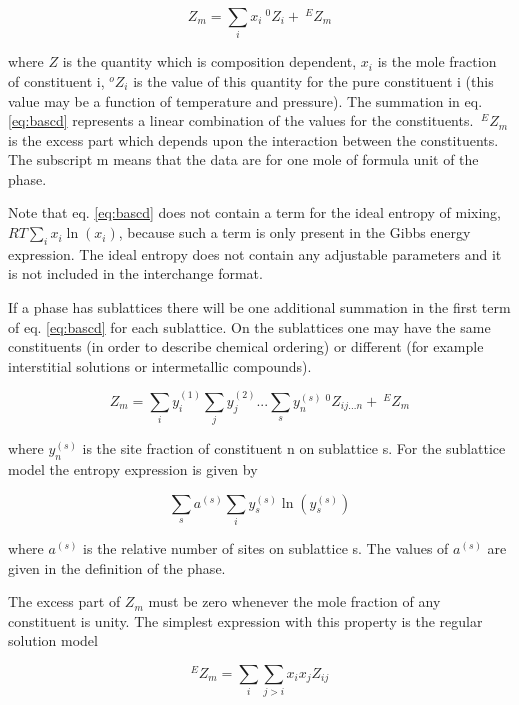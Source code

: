 \documentclass[12pt]{article}
\begin{document}
\begin{equation}
Z_m = \sum_i x_i ~^0Z_i + ~^EZ_m \label{eq:bascd}
\end{equation}

\noindent
where $Z$ is the quantity which is composition dependent, $x_i$ is the
mole fraction of constituent i, $^oZ_i$ is the value of this quantity
for the pure constituent i (this value may be a function of
temperature and pressure). The summation in eq. \ref{eq:bascd}
represents a linear combination of the values for the
constituents. $~^EZ_m$ is the excess part which depends upon the
interaction between the constituents. The subscript m means that the
data are for one mole of formula unit of the phase.

Note that eq. \ref{eq:bascd} does not contain a term for the ideal
entropy of mixing, $RT\sum_i x_i\ln(x_i)$, because such a term is only
present in the Gibbs energy expression. The ideal entropy does not
contain any adjustable parameters and it is not included in the
interchange format.

If a phase has sublattices there will be one additional summation in
the first term of eq. \ref{eq:bascd} for each sublattice. On the
sublattices one may have the same constituents (in order to describe
chemical ordering) or different (for example interstitial solutions or
intermetallic compounds).

\begin{equation}
Z_m = \sum_i y_i^{(1)} \sum_j y_j^{(2)} ... \sum_s y_n^{(s)} ~^0Z_{ij...n} + ~^EZ_m \label{eq:bassubl}
\end{equation}

\noindent
where $y_n^{(s)}$ is the site fraction of constituent n on sublattice
s.  For the sublattice model the entropy expression is given by

\begin{equation}
\sum_s a^{(s)} \sum_i y_s^{(s)} \ln(y_s^{(s)})
\end{equation}

\noindent
where $a^{(s)}$ is the relative number of sites on sublattice s.  The
values of $a^{(s)}$ are given in the definition of the phase.

The excess part of $Z_m$ must be zero whenever the mole fraction of any
constituent is unity. The simplest expression with this property is
the regular solution model

\begin{equation}
^EZ_m = \sum_i \sum_{j>i} x_i x_j Z_{ij} \label{eq:excess}
\end{equation}
\end{document}
